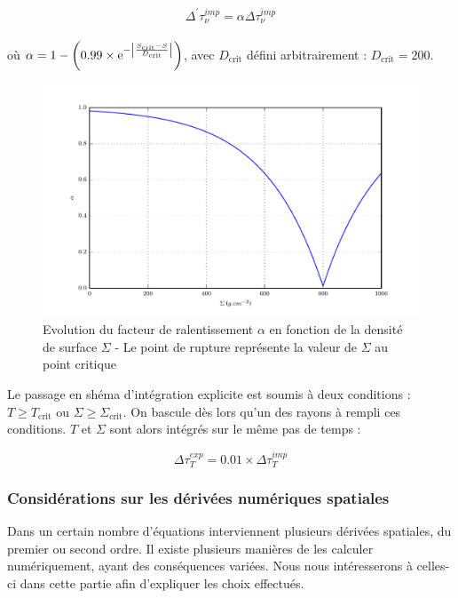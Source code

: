 \begin{equation}
	\Delta^{'} \tau_{\nu}^{imp} = \alpha \Delta \tau_{\nu}^{imp}
\end{equation} \\

où $\alpha = 1 - \left( 0.99 \times \e^{- \left| \frac{S_\textrm{crit} - S}{D_\textrm{crit}} \right|} \right)$, avec $D_\textrm{crit}$ défini arbitrairement : $D_\textrm{crit} = 200$.


\begin{figure}
  \includegraphics{figures/alpha_fonction_de_sigma.pdf}
  \caption{Evolution du facteur de ralentissement $\alpha$ en fonction de la densité de surface $\Sigma$ - Le point de rupture représente la valeur de $\Sigma$ au point critique}
  \label{fig::alpha_fct_sig}
\end{figure}

Le passage en shéma d'intégration explicite est soumis à deux conditions : $T
\ge T_\textrm{crit}$ ou $\Sigma \ge \Sigma_\textrm{crit}$. On bascule dès lors
qu'un des rayons à rempli ces conditions. $T$ et $\Sigma$ sont alors intégrés
sur le même pas de temps :

\begin{equation}
\Delta \tau_{T}^{exp} = 0.01 \times \Delta \tau_{T}^{imp}
\end{equation}

\subsubsection{Considérations sur les dérivées numériques spatiales}

Dans un certain nombre d’équations interviennent plusieurs dérivées spatiales,
du premier ou second ordre. Il existe plusieurs manières de les calculer
numériquement, ayant des conséquences variées. Nous nous intéresserons à
celles-ci dans cette partie afin d’expliquer les choix effectués.

